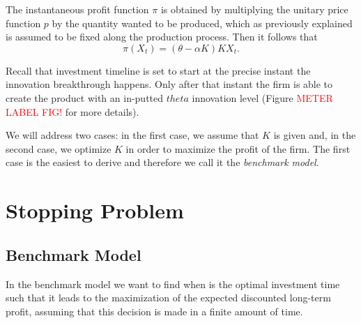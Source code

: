 The instantaneous profit function $\pi$ is obtained by multiplying the unitary price function $p$ by the quantity wanted to be produced, which as previously explained is assumed to be fixed along the production process. Then it follows that
\begin{equation}
\pi(X_t)=(\theta-\alpha K)K X_t.
\label{prob1:pi}
\end{equation}



Recall that investment timeline is set to start at the precise instant the innovation breakthrough happens. Only after that instant the firm is able to create the product with an in-putted $theta$ innovation level (Figure \textcolor{red}{METER LABEL FIG!} for more details).



We will address two cases: in the first case, we assume that $K$ is given and, in the second case, we optimize $K$ in order to maximize the profit of the firm. The first case is the easiest to derive and therefore we call it the \textit{benchmark model}.



\section{Stopping Problem}
\label{section:1_theory}



\subsection{Benchmark Model}
\label{subsec:1_bm}

In the benchmark model we want to find when is the optimal investment time such that it leads to the maximization of the expected discounted long-term profit, assuming that this decision is made in a finite amount of time.

